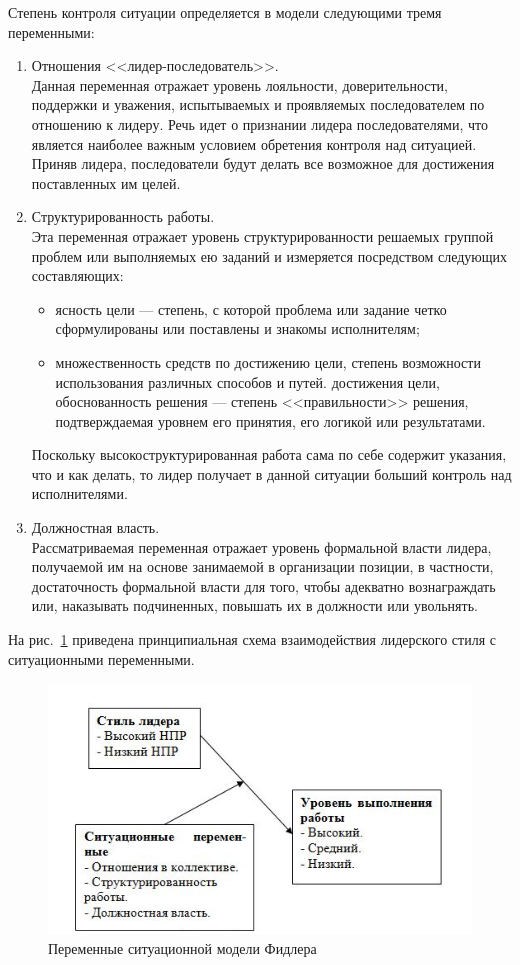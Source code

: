 \documentclass[a4paper,12pt,oneside,final]{extarticle}
\makeatletter
\numberwithin{equation}{section}
\def\maxwidth#1{\ifdim\Gin@nat@width>#1 #1\else\Gin@nat@width\fi}
\makeatother
\begin{document}
Степень контроля ситуации определяется в модели следующими тремя переменными:
\begin{enumerate}
	\item Отношения <<лидер-последователь>>. \\
	Данная переменная отражает уровень лояльности, доверительности, поддержки и уважения, испытываемых и проявляемых последователем по отношению к лидеру.
	Речь идет о признании лидера последователями, что является наиболее важным условием обретения контроля над ситуацией. 
	Приняв лидера, последователи будут делать все возможное для достижения поставленных им целей.
	\item Структурированность работы. \\
	Эта переменная отражает уровень структурированности решаемых группой проблем или выполняемых ею заданий и измеряется посредством следующих составляющих:
	\begin{itemize}
		\item ясность цели --- степень, с которой проблема или задание четко сформулированы или поставлены и знакомы исполнителям;
		\item множественность средств по достижению цели, степень возможности использования различных способов и путей. достижения цели, обоснованность решения --- степень <<правильности>> решения, подтверждаемая уровнем его принятия, его логикой или результатами.
	\end{itemize}
	Поскольку высокоструктурированная работа сама по себе содержит указания, что и как делать, то лидер получает в данной ситуации больший контроль над исполнителями.
	\item Должностная власть. \\
	Рассматриваемая переменная отражает уровень формальной власти лидера, получаемой им на основе занимаемой в организации позиции, в частности, достаточность формальной власти для того, чтобы адекватно вознаграждать или, наказывать подчиненных, повышать их в должности или увольнять.
\end{enumerate}

На рис.~\ref{leadership_fd_var} приведена принципиальная схема взаимодействия лидерского стиля с ситуационными переменными.

\begin{figure}[h]
	\centering
	\includegraphics[width=\maxwidth{\textwidth}]{management-figures/leadership_fd_var}
	\caption{Переменные ситуационной модели Фидлера}
	\label{leadership_fd_var}
\end{figure}
\end{document}
